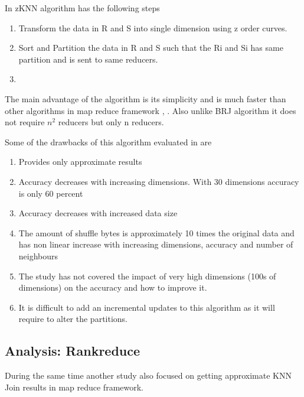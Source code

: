 \documentclass[conference]{IEEEtran}
\begin{document}
\bigskip

In zKNN algorithm has the following steps
\begin{enumerate}
\item Transform the data in R and S into single dimension using z order
  curves.
\item Sort and Partition the data in R and S such that the Ri and Si
  has same partition and is sent to same reducers.
\item
\end{enumerate}

\bigskip

The main advantage of the algorithm is its simplicity and is much
faster than other algorithms in map reduce framework
\cite{lu_efficient_2012},
\cite{stupar_rankreduceprocessing_2010}. Also unlike BRJ algorithm it
does not require $n^2$ reducers but only n reducers.

\medskip

Some of the drawbacks of this algorithm evaluated in
\cite{song_solutions_2015} are
\begin{enumerate}
\item Provides only approximate results
\item Accuracy decreases with increasing dimensions. With 30 dimensions
  accuracy is only 60 percent
\item Accuracy decreases with increased data size
\item The amount of shuffle bytes is approximately 10 times the
  original data and has non linear increase with increasing dimensions, accuracy and
  number of neighbours
\item The study has not covered the impact of very high dimensions
  (100s of dimensions) on the accuracy and how to improve it.
\item It is difficult to add an incremental updates to this algorithm
  as it will require to alter the partitions.
\end{enumerate}

\bigskip

\subsection{Analysis: Rankreduce}

During the same time another study
\cite{stupar_rankreduceprocessing_2010} also focused on getting
approximate KNN Join results in map reduce framework.

\medskip
\end{document}
